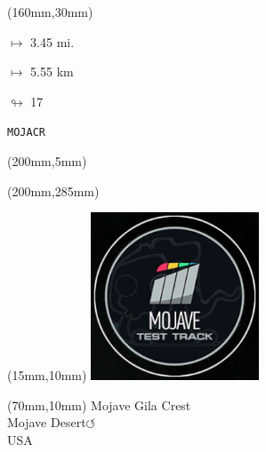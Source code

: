 \begin{textblock*}{40mm}(160mm,30mm)%
\Large
\par$\mapsto$ 3.45 mi.
\par$\mapsto$ 5.55 km
\par$\looparrowright$ 17
\par\hfill\tiny\tt MOJACR\\
\end{textblock*}
\begin{textblock*}{20mm}(200mm,5mm)%
\fbox{\thepage}
\label{MOJACR}
\end{textblock*}
\begin{textblock*}{20mm}(200mm,285mm)%
\fbox{\thepage}
\end{textblock*}

\null\newpage
\begin{textblock*}{50mm}(15mm,10mm)%
\includegraphics[width=50mm]{LG/MOJA.png}
\end{textblock*}
\begin{textblock*}{130mm}(70mm,10mm)%
{\fontsize{20}{20}\selectfont Mojave Gila Crest\\}
{\fontsize{16}{16}\selectfont Mojave Desert\hfill \Large$\circlearrowleft$\\}
{\fontsize{12}{12}\selectfont USA\\}
\end{textblock*}
